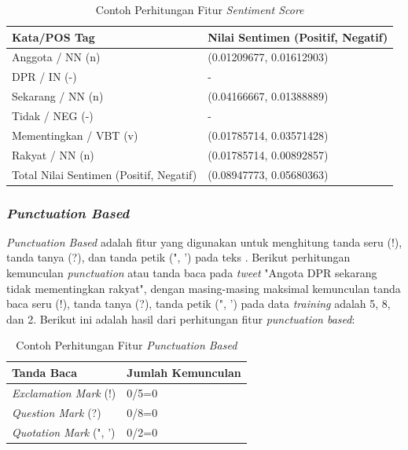 \begin{table}[H]
	\caption{Contoh Perhitungan Fitur \textit{Sentiment Score}}
	\centering
	\small
	\begin{adjustbox}{width=1\textwidth}
	\begin{tabular}{|p{7cm}|p{6cm}|}
		\hline
		\textbf{Kata/POS Tag} & \textbf{Nilai Sentimen (Positif, Negatif)} \\
		\hline
		Anggota / NN (n) & (0.01209677, 0.01612903) \\
		\hline
		DPR / IN (-) & - \\
		\hline
		Sekarang / NN (n) & (0.04166667, 0.01388889) \\
		\hline
		Tidak / NEG (-) & - \\
		\hline
		Mementingkan / VBT (v) & (0.01785714, 0.03571428) \\
		\hline
		Rakyat / NN (n) & (0.01785714, 0.00892857) \\
		\hline
		Total Nilai Sentimen (Positif, Negatif) & (0.08947773, 0.05680363) \\
		\hline
	\end{tabular}
	\end{adjustbox}
\end{table}
\subsubsection{\textit{Punctuation Based}}
\textit{Punctuation Based} adalah fitur yang digunakan untuk menghitung tanda seru (!), tanda tanya (?), dan tanda petik (", ') pada teks \cite{3}. Berikut perhitungan kemunculan \textit{punctuation} atau tanda baca pada \textit{tweet} "Angota DPR sekarang tidak mementingkan rakyat", dengan masing-masing maksimal kemunculan tanda baca seru (!), tanda tanya (?), tanda petik (", ') pada data \textit{training} adalah 5, 8, dan 2. Berikut ini adalah hasil dari perhitungan fitur \textit{punctuation based}:

\begin{table}[H]
	\caption{Contoh Perhitungan Fitur \textit{Punctuation Based}}
	\centering
	\small
	\begin{adjustbox}{width=1\textwidth}
	\begin{tabular}{|p{7cm}|p{6cm}|}
		\hline
		\textbf{Tanda Baca} & \textbf{Jumlah Kemunculan}\\
		\hline
		\textit{Exclamation Mark }(!) & 0/5=0 \\
		\hline
		\textit{Question Mark }(?) & 0/8=0 \\
		\hline
		\textit{Quotation Mark }(", ') & 0/2=0 \\
		\hline
	\end{tabular}
	\end{adjustbox}
\end{table}
